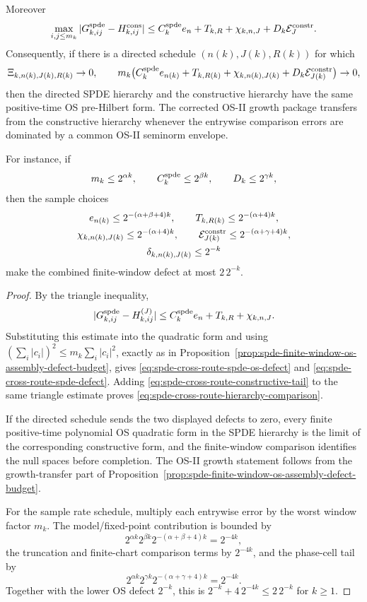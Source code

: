 \begin{proposition}
\begin{equation}
\end{equation}
Moreover
\begin{equation}
  \max_{i,j\leq m_k}
  |G_{k,ij}^{\rm spde}-H_{k,ij}^{\rm cons}|
  \leq
  C_k^{\rm spde} e_n+T_{k,R}+\chi_{k,n,J}
  +D_k\mathcal E_J^{\rm constr}.
  \label{eq:spde-cross-route-hierarchy-comparison}
\end{equation}
Consequently, if there is a directed schedule
\((n(k),J(k),R(k))\) for which
\[
  \Xi_{k,n(k),J(k),R(k)}\to0,\qquad
  m_k\bigl(C_k^{\rm spde} e_{n(k)}+T_{k,R(k)}
  +\chi_{k,n(k),J(k)}
  +D_k\mathcal E_{J(k)}^{\rm constr}\bigr)\to0,
\]
then the directed SPDE hierarchy and the constructive hierarchy have the same
positive-time OS pre-Hilbert form.  The corrected OS-II growth package
transfers from the constructive hierarchy whenever the entrywise comparison
errors are dominated by a common OS-II seminorm envelope.

For instance, if
\[
  m_k\leq2^{\alpha k},\qquad
  C_k^{\rm spde}\leq2^{\beta k},\qquad
  D_k\leq2^{\gamma k},
\]
then the sample choices
\[
\begin{gathered}
  e_{n(k)}\leq2^{-(\alpha+\beta+4)k},\qquad
  T_{k,R(k)}\leq2^{-(\alpha+4)k},\\
  \chi_{k,n(k),J(k)}\leq2^{-(\alpha+4)k},\qquad
  \mathcal E_{J(k)}^{\rm constr}\leq2^{-(\alpha+\gamma+4)k},\\
  \delta_{k,n(k),J(k)}\leq2^{-k}
\end{gathered}
\]
make the combined finite-window defect at most \(2\,2^{-k}\).
\end{proposition}

\begin{proof}
By the triangle inequality,
\[
  |G_{k,ij}^{\rm spde}-H_{k,ij}^{(J)}|
  \leq
  C_k^{\rm spde}e_n+T_{k,R}+\chi_{k,n,J}.
\]
Substituting this estimate into the quadratic form and using
\((\sum_i|c_i|)^2\leq m_k\sum_i|c_i|^2\), exactly as in
Proposition~\ref{prop:spde-finite-window-os-assembly-defect-budget}, gives
\eqref{eq:spde-cross-route-spde-os-defect} and
\eqref{eq:spde-cross-route-spde-defect}.  Adding
\eqref{eq:spde-cross-route-constructive-tail} to the same triangle estimate
proves \eqref{eq:spde-cross-route-hierarchy-comparison}.

If the directed schedule sends the two displayed defects to zero, every
finite positive-time polynomial OS quadratic form in the SPDE hierarchy is the
limit of the corresponding constructive form, and the finite-window
comparison identifies the null spaces before completion.  The OS-II growth
statement follows from the growth-transfer part of
Proposition~\ref{prop:spde-finite-window-os-assembly-defect-budget}.

For the sample rate schedule, multiply each entrywise error by the worst
window factor \(m_k\).  The model/fixed-point contribution is bounded by
\[
  2^{\alpha k}2^{\beta k}2^{-(\alpha+\beta+4)k}=2^{-4k},
\]
the truncation and finite-chart comparison terms by \(2^{-4k}\), and the
phase-cell tail by
\[
  2^{\alpha k}2^{\gamma k}2^{-(\alpha+\gamma+4)k}=2^{-4k}.
\]
Together with the lower OS defect \(2^{-k}\), this is
\(2^{-k}+4\,2^{-4k}\leq2\,2^{-k}\) for \(k\geq1\).
\end{proof}

